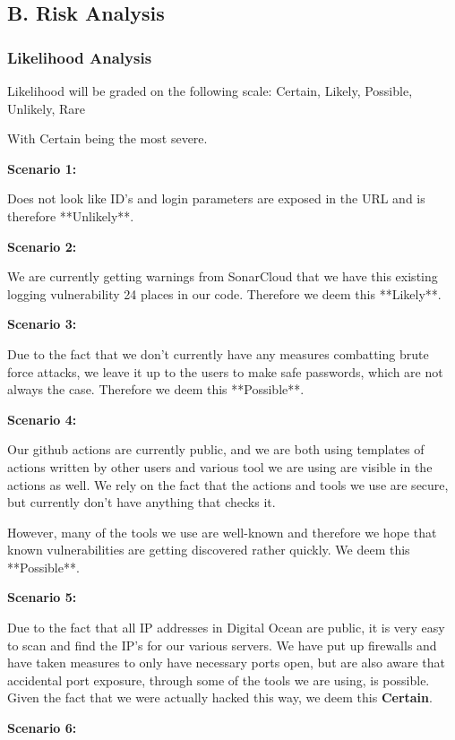 \subsection{B. Risk Analysis}

\subsubsection{Likelihood Analysis}

Likelihood will be graded on the following scale: {Certain, Likely, Possible, Unlikely, Rare}

With Certain being the most severe.

\textbf{Scenario 1:}

Does not look like ID's and login parameters are exposed in the URL and is therefore **Unlikely**.

\textbf{Scenario 2:}

We are currently getting warnings from SonarCloud that we have this existing logging vulnerability 24 places in our code. Therefore we deem this **Likely**.

\textbf{Scenario 3:}

Due to the fact that we don't currently have any measures combatting brute force attacks, we leave it up to the users to make safe passwords, which are not always the case. Therefore we deem this **Possible**.

\textbf{Scenario 4:}

Our github actions are currently public, and we are both using templates of actions written by other users and various tool we are using are visible in the actions as well. We rely on the fact that the actions and tools we use are secure, but currently don't have anything that checks it.

However, many of the tools we use are well-known and therefore we hope that known vulnerabilities are getting discovered rather quickly. We deem this **Possible**.

\textbf{Scenario 5:}

Due to the fact that all IP addresses in Digital Ocean are public, it is very easy to scan and find the IP's for our various servers. We have put up firewalls and have taken measures to only have necessary ports open, but are also aware that accidental port exposure, through some of the tools we are using, is possible. Given the fact that we were actually hacked this way, we deem this \textbf{Certain}.

\textbf{Scenario 6:}

